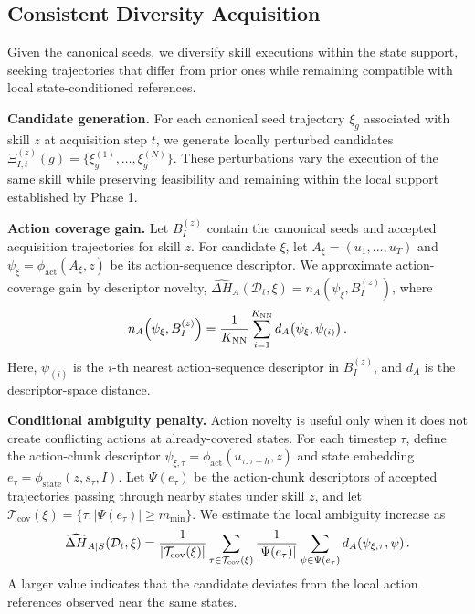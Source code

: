 \documentclass{article}
\begin{document}
\subsection{Consistent Diversity Acquisition}
\label{sec:method:m2}
Given the canonical seeds, we diversify skill executions within the state support, seeking trajectories that differ from prior ones while remaining compatible with local state-conditioned references.

\textbf{Candidate generation.}
For each canonical seed trajectory $\xi_g$ associated with skill $z$ at acquisition step $t$, we generate locally perturbed candidates $\Xi_{I,t}^{(z)}(g) = \{\xi_g^{(1)},\ldots,\xi_g^{(N)}\}$. These perturbations vary the execution of the same skill while preserving feasibility and remaining within the local support established by Phase 1.

\textbf{Action coverage gain.}
Let $B_I^{(z)}$ contain the canonical seeds and accepted acquisition trajectories for skill $z$. For candidate $\xi$, let $A_\xi=(u_1,\ldots,u_T)$ and $\psi_\xi=\phi_{\mathrm{act}}(A_\xi,z)$ be its action-sequence descriptor. We approximate action-coverage gain by descriptor novelty, $\widehat{\Delta H}_A(\mathcal{D}_t,\xi)=n_A(\psi_\xi,B_I^{(z)})$, where
\begin{equation} \small
\small
n_A\!\left(\psi_\xi, B_I^{(z)}\right)
=
\frac{1}{K_{\mathrm{NN}}}
\sum_{i=1}^{K_{\mathrm{NN}}}
d_A\!\left(\psi_\xi, \psi_{(i)}\right).
\label{eq:p2-action-novelty}
\end{equation}
Here, $\psi_{(i)}$ is the $i$-th nearest action-sequence descriptor in $B_I^{(z)}$, and $d_A$ is the descriptor-space distance.

\textbf{Conditional ambiguity penalty.}
Action novelty is useful only when it does not create conflicting actions at already-covered states. For each timestep $\tau$, define the action-chunk descriptor $\psi_{\xi,\tau}=\phi_{\mathrm{act}}(u_{\tau:\tau+h},z)$ and state embedding $e_\tau=\phi_{\mathrm{state}}(z,s_\tau,I)$. Let $\Psi(e_\tau)$ be the action-chunk descriptors of accepted trajectories passing through nearby states under skill $z$, and let $\mathcal{T}_{\mathrm{cov}}(\xi)=\{\tau:|\Psi(e_\tau)|\ge m_{\min}\}$. We estimate the local ambiguity increase as
\begin{equation} \small
\small
\widehat{\Delta H}_{A \mid S}(\mathcal{D}_t,\xi)
=
\frac{1}{|\mathcal{T}_{\mathrm{cov}}(\xi)|}
\sum_{\tau \in \mathcal{T}_{\mathrm{cov}}(\xi)}
\frac{1}{|\Psi(e_\tau)|}
\sum_{\psi \in \Psi(e_\tau)}
d_A\!\left(\psi_{\xi,\tau},\psi\right).
\label{eq:p2-cond-amb}
\end{equation}
A larger value indicates that the candidate deviates from the local action references observed near the same states.
\end{document}
